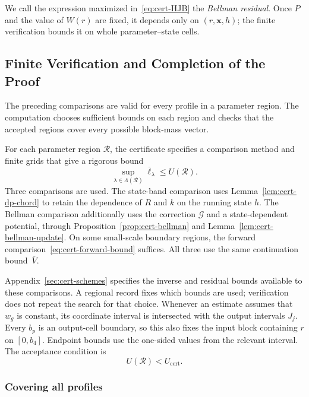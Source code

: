\documentclass[11pt]{article}
\theoremstyle{definition}
\theoremstyle{remark}
\begin{document}
We call the expression maximized in~\eqref{eq:cert-HJB} the
\emph{Bellman residual}.  Once $P$ and the value of $W(r)$ are fixed,
it depends only on $(r,\mathbf x,h)$; the finite verification bounds
it on whole parameter--state cells.

\subsection{Finite Verification and Completion of the Proof}
\label{sec:cert-results}\label{sec:cert-scheme-overview}

The preceding comparisons are valid for every profile in a parameter
region.  The computation chooses sufficient bounds on each region and
checks that the accepted regions cover every possible block-mass vector.

For each parameter region $\mathcal R$, the certificate specifies a
comparison method and finite grids that give a rigorous bound
\begin{equation}\label{eq:cert-regional-verifier-goal}
 \sup_{\lambda\in\Lambda(\mathcal R)}
 \overline\ell_\lambda\le U(\mathcal R).
\end{equation}
Three comparisons are used.  The state-band comparison uses
Lemma~\ref{lem:cert-dp-chord} to retain the dependence of $R$ and $k$
on the running state $h$.  The Bellman comparison additionally uses
the correction $\mathcal G$ and a state-dependent potential, through
Proposition~\ref{prop:cert-bellman} and
Lemma~\ref{lem:cert-bellman-update}.  On some small-scale boundary
regions, the forward comparison~\eqref{eq:cert-forward-bound} suffices.
All three use the same continuation bound~$\overline V$.

Appendix~\ref{sec:cert-schemes} specifies the inverse and residual
bounds available to these comparisons.  A regional record fixes which
bounds are used; verification does not repeat the search for that choice.
Whenever an estimate assumes that $w_g$ is constant, its coordinate
interval is intersected with the output intervals $J_j$.
Every $b_p$ is an output-cell boundary, so this also fixes the input
block containing $r$ on $[0,b_4]$.  Endpoint bounds use the one-sided
values from the relevant interval.  The acceptance condition is
\begin{equation}\label{eq:cert-scheme-accept}
 U(\mathcal R)<U_{\mathrm{cert}}.
\end{equation}

\subsubsection{Covering all profiles}\label{app:cert-cover}
\end{document}
